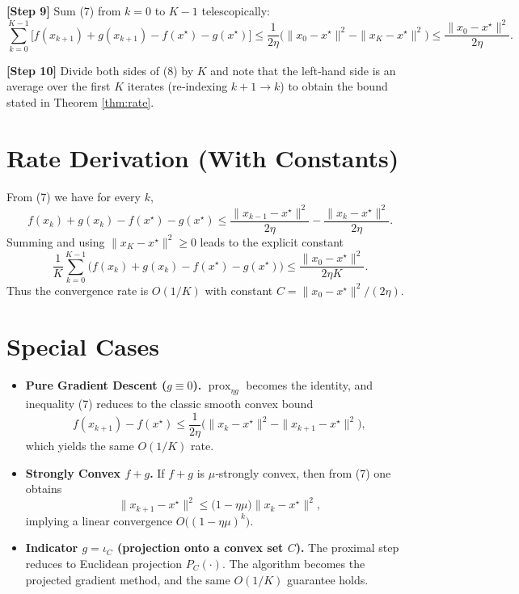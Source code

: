 \documentclass{article}
\newcommand{\prox}{\operatorname{prox}}
\begin{document}
\noindent\textbf{[Step 9]} Sum (7) from $k=0$ to $K-1$ telescopically:
\[
\sum_{k=0}^{K-1}\bigl[f(x_{k+1})+g(x_{k+1})-f(x^{\star})-g(x^{\star})\bigr]
\le \frac{1}{2\eta}\bigl(\|x_{0}-x^{\star}\|^{2}-\|x_{K}-x^{\star}\|^{2}\bigr)
\le \frac{\|x_{0}-x^{\star}\|^{2}}{2\eta}.
\tag{8}
\]

\noindent\textbf{[Step 10]} Divide both sides of (8) by $K$ and note that the left‑hand side is an average over the first $K$ iterates (re‑indexing $k+1\to k$) to obtain the bound stated in Theorem \ref{thm:rate}.

\section*{Rate Derivation (With Constants)}
From (7) we have for every $k$,
\[
f(x_{k})+g(x_{k})-f(x^{\star})-g(x^{\star})
\le \frac{\|x_{k-1}-x^{\star}\|^{2}}{2\eta}
-\frac{\|x_{k}-x^{\star}\|^{2}}{2\eta}.
\]
Summing and using $\|x_{K}-x^{\star}\|^{2}\ge0$ leads to the explicit constant
\[
\frac{1}{K}\sum_{k=0}^{K-1}\bigl(f(x_{k})+g(x_{k})-f(x^{\star})-g(x^{\star})\bigr)
\le \frac{\|x_{0}-x^{\star}\|^{2}}{2\eta K}.
\]
Thus the convergence rate is $O(1/K)$ with constant $C=\|x_{0}-x^{\star}\|^{2}/(2\eta)$.

\section*{Special Cases}
\begin{itemize}
\item \textbf{Pure Gradient Descent ($g\equiv0$).} $\prox_{\eta g}$ becomes the identity, and inequality (7) reduces to the classic smooth convex bound
\[
f(x_{k+1})-f(x^{\star})\le\frac{1}{2\eta}\bigl(\|x_{k}-x^{\star}\|^{2}-\|x_{k+1}-x^{\star}\|^{2}\bigr),
\]
which yields the same $O(1/K)$ rate.
\item \textbf{Strongly Convex $f+g$.} If $f+g$ is $\mu$‑strongly convex, then from (7) one obtains
\[
\|x_{k+1}-x^{\star}\|^{2}\le\bigl(1-\eta\mu\bigr)\|x_{k}-x^{\star}\|^{2},
\]
implying a linear convergence $O\bigl((1-\eta\mu)^{k}\bigr)$.
\item \textbf{Indicator $g=\iota_{C}$ (projection onto a convex set $C$).} The proximal step reduces to Euclidean projection $P_{C}(\cdot)$. The algorithm becomes the projected gradient method, and the same $O(1/K)$ guarantee holds.
\end{itemize}
\end{document}
